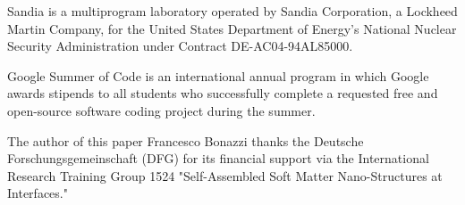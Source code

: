 Sandia is a multiprogram laboratory operated by Sandia Corporation, a Lockheed Martin Company, for the United States Department of Energy's National Nuclear Security Administration under Contract DE-AC04-94AL85000.

Google Summer of Code is an international annual program in which Google awards stipends to all students who successfully complete a requested free and open-source software coding project during the summer.

The author of this paper Francesco Bonazzi thanks the Deutsche
Forschungsgemeinschaft (DFG) for its financial support via the International
Research Training Group 1524 "Self-Assembled Soft Matter Nano-Structures at
Interfaces."

